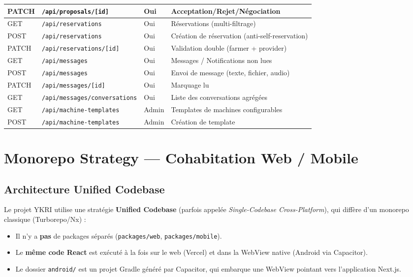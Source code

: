 \documentclass[12pt, a4paper]{article}
\begin{document}
\begin{longtable}{l l l p{5cm}}
PATCH & \texttt{/api/proposals/[id]}     & Oui & Acceptation/Rejet/Négociation \\
\midrule
GET  & \texttt{/api/reservations}        & Oui & Réservations (multi-filtrage) \\
POST & \texttt{/api/reservations}        & Oui & Création de réservation (anti-self-reservation) \\
PATCH & \texttt{/api/reservations/[id]}  & Oui & Validation double (farmer + provider) \\
\midrule
GET  & \texttt{/api/messages}            & Oui & Messages / Notifications non lues \\
POST & \texttt{/api/messages}            & Oui & Envoi de message (texte, fichier, audio) \\
PATCH & \texttt{/api/messages/[id]}      & Oui & Marquage lu \\
GET  & \texttt{/api/messages/conversations} & Oui & Liste des conversations agrégées \\
\midrule
GET  & \texttt{/api/machine-templates}   & Admin & Templates de machines configurables \\
POST & \texttt{/api/machine-templates}   & Admin & Création de template \\
\bottomrule
\end{longtable}

\section{Monorepo Strategy — Cohabitation Web / Mobile}

\subsection{Architecture Unified Codebase}

Le projet YKRI utilise une stratégie \textbf{Unified Codebase} (parfois appelée \textit{Single-Codebase Cross-Platform}), qui diffère d'un monorepo classique (Turborepo/Nx) :

\begin{itemize}[leftmargin=2em]
  \item Il n'y a \textbf{pas} de packages séparés (\texttt{packages/web}, \texttt{packages/mobile}).
  \item Le \textbf{même code React} est exécuté à la fois sur le web (Vercel) et dans la WebView native (Android via Capacitor).
  \item Le dossier \texttt{android/} est un projet Gradle généré par Capacitor, qui embarque une WebView pointant vers l'application Next.js.
\end{itemize}
\end{document}
